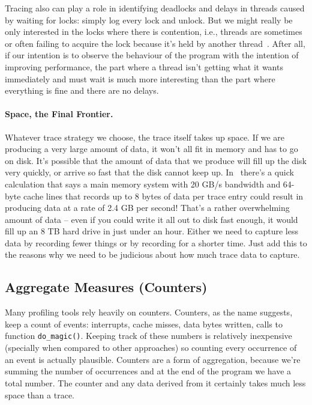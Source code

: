 Tracing also can play a role in identifying deadlocks and delays in threads caused by waiting for locks: simply log every lock and unlock. But we might really be only interested in the locks where there is contention, i.e., threads are sometimes or often failing to acquire the lock because it's held by another thread~\cite{usd}. After all, if our intention is to observe the behaviour of the program with the intention of improving performance, the part where a thread isn't getting what it wants immediately and must wait is much more interesting than the part where everything is fine and there are no delays.

\paragraph{Space, the Final Frontier.} Whatever trace strategy we choose, the trace itself takes up space. If we are producing a very large amount of data, it won't all fit in memory and has to go on disk. It's possible that the amount of data that we produce will fill up the disk very quickly, or arrive so fast that the disk cannot keep up. In~\cite{usd} there's a quick calculation that says a main memory system with 20 GB/s bandwidth and 64-byte cache lines that records up to 8 bytes of data per trace entry could result in producing data at a rate of 2.4 GB per second! That's a rather overwhelming amount of data -- even if you could write it all out to disk fast enough, it would fill up an 8 TB hard drive in just under an hour. Either we need to capture less data by recording fewer things or by recording for a shorter time. Just add this to the reasons why we need to be judicious about how much trace data to capture.

\subsection*{Aggregate Measures (Counters)}
Many profiling tools rely heavily on counters. Counters, as the name suggests, keep a count of events: interrupts, cache misses, data bytes written, calls to function \texttt{do\_magic()}. Keeping track of these numbers is relatively inexpensive (specially when compared to other approaches) so counting every occurrence of an event is actually plausible. Counters are a form of aggregation, because we're summing the number of occurrences and at the end of the program we have a total number. The counter and any data derived from it certainly takes much less space than a trace.

